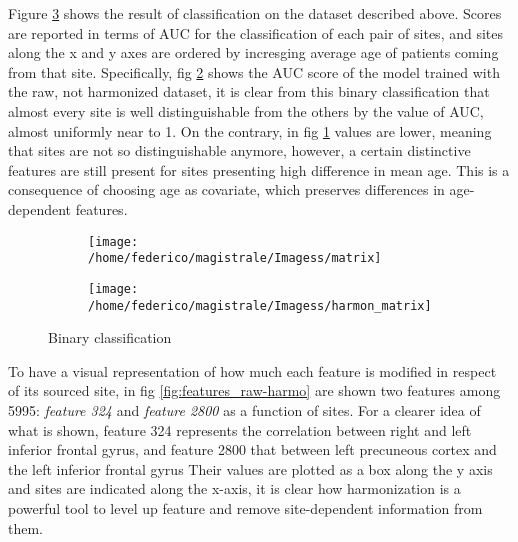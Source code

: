 \documentclass[a4paper,11pt]{article}
\begin{document}
Figure \ref{fig:heatmap_harmonization} shows the result of classification on the dataset described above. Scores are reported in terms of AUC for the classification of each pair of sites, and sites along the x and y axes are ordered by incresging average age of patients coming from that site.
Specifically, fig \ref{fig:heatmap_harmonization_noharmon} shows the AUC score of the model trained with the raw, not harmonized dataset, it is clear from this binary classification that almost every site is well distinguishable from the others by the value of AUC, almost uniformly near to 1.
On the contrary, in fig \ref{fig:heatmap_harmonization_harmon} values are lower, meaning that sites are not so distinguishable anymore, however, a certain distinctive features are still present for sites presenting high difference in mean age.
This is a consequence of choosing age as covariate, which preserves differences in age-dependent features.




\begin{figure}
\centering
\begin{subfigure}[b]{0.8\textwidth}
   \texttt{[image: /home/federico/magistrale/Imagess/matrix]}
   \caption{}
   \label{fig:heatmap_harmonization_harmon}
\end{subfigure}

\begin{subfigure}[b]{0.8\textwidth}
   \texttt{[image: /home/federico/magistrale/Imagess/harmon\_matrix]}
   \caption{}
   \label{fig:heatmap_harmonization_noharmon}
\end{subfigure}

\caption{Binary classification}
\label{fig:heatmap_harmonization}
\end{figure}

\cite{pomponio}
To have a visual representation of how much each feature is modified in respect of its sourced site, in fig \ref{fig:features_raw-harmo} are shown two features among 5995: \emph{feature 324} and \emph{feature 2800} as a function of sites.
For a clearer idea of what is shown, feature 324 represents the correlation between right and left inferior frontal gyrus, and feature 2800 that between left precuneous cortex and the left inferior frontal gyrus
Their values are plotted as a box along the y axis and sites are indicated along the x-axis, it is clear how harmonization is a powerful tool to level up feature and remove site-dependent information from them.
\end{document}
